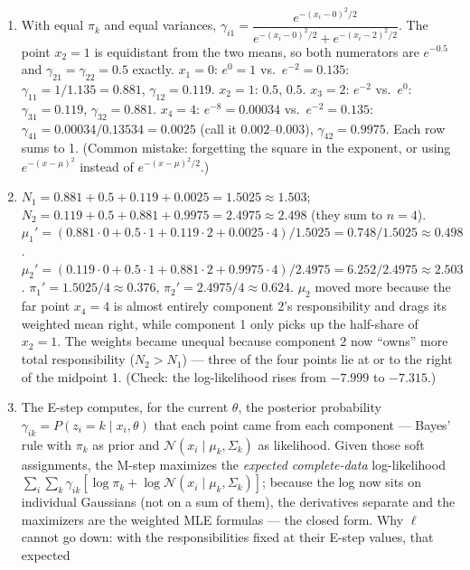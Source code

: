 \documentclass[
  11pt,
]{article}
\begin{document}
\begin{solutionbox}
\begin{enumerate}
\def\labelenumi{(\alph{enumi})}
\item
  With equal \(\pi_k\) and equal variances,
  \(\gamma_{i1} = \dfrac{e^{-(x_i-0)^2/2}}
  {e^{-(x_i-0)^2/2} + e^{-(x_i-2)^2/2}}\). The point \(x_2 = 1\) is
  equidistant from the two means, so both numerators are \(e^{-0.5}\)
  and \(\gamma_{21} = \gamma_{22} = 0.5\) exactly. \(x_1 = 0\):
  \(e^{0}=1\) vs.~\(e^{-2} = 0.135\): \(\gamma_{11} = 1/1.135 = 0.881\),
  \(\gamma_{12} = 0.119\). \(x_2 = 1\): \(0.5\), \(0.5\). \(x_3 = 2\):
  \(e^{-2}\) vs.~\(e^0\): \(\gamma_{31} = 0.119\),
  \(\gamma_{32} = 0.881\). \(x_4 = 4\): \(e^{-8} = 0.00034\)
  vs.~\(e^{-2} = 0.135\): \(\gamma_{41} = 0.00034/0.13534 = 0.0025\)
  (call it \(0.002\)--\(0.003\)), \(\gamma_{42} = 0.9975\). Each row
  sums to 1. (Common mistake: forgetting the square in the exponent, or
  using \(e^{-(x-\mu)^2}\) instead of \(e^{-(x-\mu)^2/2}\).)
\item
  \(N_1 = 0.881+0.5+0.119+0.0025 = 1.5025 \approx 1.503\);
  \(N_2 = 0.119+0.5+0.881+0.9975 = 2.4975 \approx 2.498\) (they sum to
  \(n=4\)).
  \(\mu_1' = (0.881\cdot0 + 0.5\cdot1 + 0.119\cdot2 + 0.0025\cdot4)/1.5025 = 0.748/1.5025 \approx 0.498\).
  \(\mu_2' = (0.119\cdot0 + 0.5\cdot1 + 0.881\cdot2 + 0.9975\cdot4)/2.4975 = 6.252/2.4975 \approx 2.503\).
  \(\pi_1' = 1.5025/4 \approx 0.376\),
  \(\pi_2' = 2.4975/4 \approx 0.624\). \(\mu_2\) moved more because the
  far point \(x_4 = 4\) is almost entirely component 2's responsibility
  and drags its weighted mean right, while component 1 only picks up the
  half-share of \(x_2 = 1\). The weights became unequal because
  component 2 now ``owns'' more total responsibility (\(N_2 > N_1\)) ---
  three of the four points lie at or to the right of the midpoint 1.
  (Check: the log-likelihood rises from \(-7.999\) to \(-7.315\).)
\item
  The E-step computes, for the current \(\theta\), the posterior
  probability \(\gamma_{ik} = P(z_i = k\mid x_i,\theta)\) that each
  point came from each component --- Bayes' rule with \(\pi_k\) as prior
  and \(\mathcal N(x_i\mid\mu_k,\Sigma_k)\) as likelihood. Given those
  soft assignments, the M-step maximizes the \emph{expected
  complete-data} log-likelihood
  \(\sum_i\sum_k \gamma_{ik}[\log\pi_k + \log\mathcal N(x_i\mid\mu_k,\Sigma_k)]\);
  because the log now sits on individual Gaussians (not on a sum of
  them), the derivatives separate and the maximizers are the weighted
  MLE formulas --- the closed form. Why \(\ell\) cannot go down: with
  the responsibilities fixed at their E-step values, that expected

\end{enumerate}
\end{solutionbox}
\end{document}
